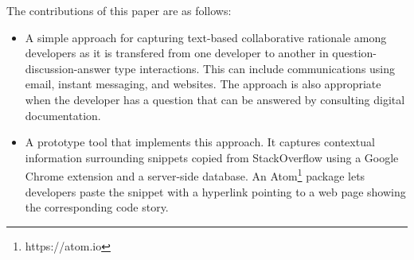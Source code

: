 \documentclass[../manifest.tex]{subfiles}
\begin{document}
The contributions of this paper are as follows:
\begin{itemize}
  \item A simple approach for capturing text-based collaborative rationale among
  developers as it is transfered from one developer to another in question-discussion-answer
  type interactions. This can include communications using email, instant messaging, and
  websites. The approach is also appropriate when the developer has a question
  that can be answered by consulting digital documentation.
  \item A prototype tool that implements this approach. It captures contextual
  information surrounding snippets copied from StackOverflow using a Google Chrome extension and a server-side database. An Atom\footnote{https://atom.io} package lets developers paste the snippet with a hyperlink pointing to a web page showing the corresponding code story.
\end{itemize}

%
%
\end{document}
